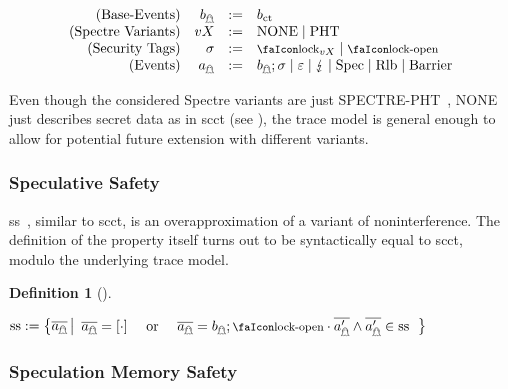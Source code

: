 \documentclass[dvipsnames,conference]{IEEEtran}
\theoremstyle{definition}
\newtheorem{definition}{Definition}[section]
\begin{document}
\vspace{-1em}
{
\[
  \begin{array}{rrcl}
    (\text{Base-Events}) & \preevent[_{\mathghost}] &:=& \preevent[_{\ctsafe}] \\
    (\text{Spectre Variants}) & vX &:=& \operatorname{NONE} \mid \operatorname{PHT} \\
    (\text{Security Tags}) & \securitytag &:=& \lock_{vX} \mid \unlock\\ 
    (\text{Events}) & \event[_{\mathghost}] &:=& \preevent[_{\mathghost}];\securitytag \mid \emptyevent \mid \lightning \mid \ev{Spec} \mid \ev{Rlb} \mid \ev{Barrier}\\ 
  \end{array}
\]
}

Even though the considered Spectre variants are just SPECTRE-PHT~\cite{kocher2019spectre}, NONE just describes secret data as in \gls*{scct} (see ), the trace model is general enough to allow for potential future extension with different variants.

\subsubsection{Speculative Safety}

\gls*{ss}~\cite{patrignani2021exorcising}, similar to \gls*{scct}, is an overapproximation of a variant of noninterference.
The definition of the property itself turns out to be syntactically equal to \gls*{scct}, modulo the underlying trace model.

\begin{definition}[]\label{def:trace:ss}
  \noindent

  \begin{nscenter}
  $
    \sssafe:=\left\{\trace[_{\mathghost}] \left|\begin{array}{rcl}
        \trace[_{\mathghost}]=\hole{\cdot} & \text{ or } & \trace[_{\mathghost}]=\preevent[_{\mathghost}];\unlock\cdot\trace[_{\mathghost}'] \wedge \trace[_{\mathghost}']\in\sssafe
                                 \end{array}\right.\right\}
  $ 
  \end{nscenter}
\end{definition}

\subsubsection{Speculation Memory Safety}
\end{document}
